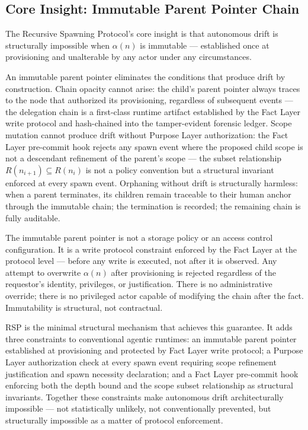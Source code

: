\subsection{Core Insight: Immutable Parent Pointer Chain}

The Recursive Spawning Protocol's core insight is that autonomous drift is structurally impossible when $\alpha(n)$ is immutable — established once at provisioning and unalterable by any actor under any circumstances.

An immutable parent pointer eliminates the conditions that produce drift by construction. Chain opacity cannot arise: the child's parent pointer always traces to the node that authorized its provisioning, regardless of subsequent events — the delegation chain is a first-class runtime artifact established by the Fact Layer write protocol and hash-chained into the tamper-evident forensic ledger. Scope mutation cannot produce drift without Purpose Layer authorization: the Fact Layer pre-commit hook rejects any spawn event where the proposed child scope is not a descendant refinement of the parent's scope — the subset relationship $R(n_{i+1}) \subseteq R(n_i)$ is not a policy convention but a structural invariant enforced at every spawn event. Orphaning without drift is structurally harmless: when a parent terminates, its children remain traceable to their human anchor through the immutable chain; the termination is recorded; the remaining chain is fully auditable.

The immutable parent pointer is not a storage policy or an access control configuration. It is a write protocol constraint enforced by the Fact Layer at the protocol level — before any write is executed, not after it is observed. Any attempt to overwrite $\alpha(n)$ after provisioning is rejected regardless of the requestor's identity, privileges, or justification. There is no administrative override; there is no privileged actor capable of modifying the chain after the fact. Immutability is structural, not contractual.

RSP is the minimal structural mechanism that achieves this guarantee. It adds three constraints to conventional agentic runtimes: an immutable parent pointer established at provisioning and protected by Fact Layer write protocol; a Purpose Layer authorization check at every spawn event requiring scope refinement justification and spawn necessity declaration; and a Fact Layer pre-commit hook enforcing both the depth bound and the scope subset relationship as structural invariants. Together these constraints make autonomous drift architecturally impossible — not statistically unlikely, not conventionally prevented, but structurally impossible as a matter of protocol enforcement.

